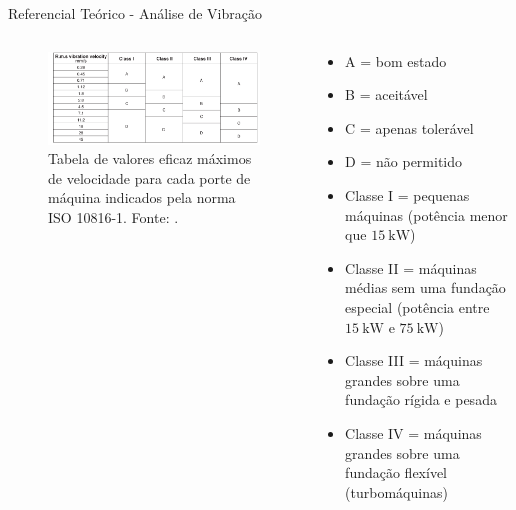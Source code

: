 \documentclass[aspectratio=169]{beamer}
\begin{document}
\begin{frame}{Referencial Teórico - Análise de Vibração}
	\begin{columns}
    	\begin{column}{0.50\textwidth}
			\begin{figure}[HT]
				\begin{center}
					\includegraphics[scale=.28]{../referencial/img/iso10816-1_randall_p146.png}
					\caption{Tabela de valores eficaz máximos de velocidade para cada porte de máquina indicados pela norma ISO 10816-1. \newline
					Fonte: .} 
					\label{fig:iso10816-1_randall_p146}
				\end{center}
			\end{figure}
     	\end{column}
		
		\begin{column}{0.5\textwidth}
			\begin{itemize}
				\item A = bom estado
				\item B = aceitável
				\item C = apenas tolerável
				\item D = não permitido
				\item Classe I = pequenas máquinas (potência menor que $\SI{15}{\kilo\watt}$)
				\item Classe II = máquinas médias sem uma fundação especial (potência entre $\SI{15}{\kilo\watt}$ e $\SI{75}{\kilo\watt}$)
				\item Classe III = máquinas grandes sobre uma fundação rígida e pesada
				\item Classe IV = máquinas grandes \newline
				sobre uma fundação flexível (turbomáquinas) 
			\end{itemize}			
	 	\end{column}
	 \end{columns}
\end{frame}
\end{document}
